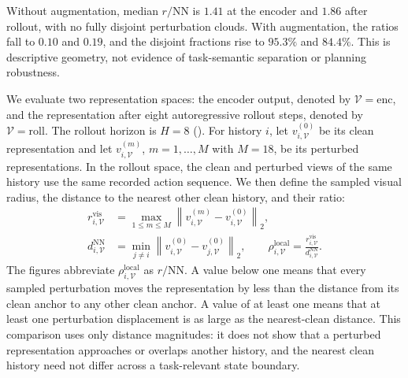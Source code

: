 \documentclass{article}
\begin{document}
Without augmentation, median $r/\mathrm{NN}$ is $1.41$ at the encoder and
$1.86$ after rollout, with no fully disjoint perturbation clouds. With
augmentation, the ratios fall to $0.10$ and $0.19$, and the disjoint fractions
rise to $95.3\%$ and $84.4\%$. This is descriptive geometry, not evidence of
task-semantic separation or planning robustness.

We evaluate two representation spaces: the encoder output, denoted by
$\mathcal V=\mathrm{enc}$, and the representation after eight autoregressive
rollout steps, denoted by $\mathcal V=\mathrm{roll}$. The rollout horizon is
$H=8$ (). For history $i$, let
$v_{i,\mathcal V}^{(0)}$ be its clean representation and let
$v_{i,\mathcal V}^{(m)}$, $m=1,\ldots,M$ with $M=18$, be its perturbed
representations. In the rollout space, the clean and perturbed views of the
same history use the same recorded action sequence. We then define the sampled
visual radius, the distance to the nearest other clean history, and their ratio:
\begin{align}
r_{i,\mathcal V}^{\mathrm{vis}}
&=\max_{1\leq m\leq M}
\left\|v_{i,\mathcal V}^{(m)}-v_{i,\mathcal V}^{(0)}\right\|_2,
\nonumber\\
d_{i,\mathcal V}^{\mathrm{NN}}
&=\min_{j\neq i}
\left\|v_{i,\mathcal V}^{(0)}-v_{j,\mathcal V}^{(0)}\right\|_2,
\qquad
\rho_{i,\mathcal V}^{\mathrm{local}}
=\frac{r_{i,\mathcal V}^{\mathrm{vis}}}
{d_{i,\mathcal V}^{\mathrm{NN}}}.
\label{eq:local-radius-spacing}
\end{align}
The figures abbreviate $\rho_{i,\mathcal V}^{\mathrm{local}}$ as
$r/\mathrm{NN}$. A value below one means that every sampled perturbation moves
the representation by less than the distance from its clean anchor to any
other clean anchor. A value of at least one means that at least one
perturbation displacement is as large as the nearest-clean distance. This
comparison uses only distance magnitudes: it does not show that a perturbed
representation approaches or overlaps another history, and the nearest clean
history need not differ across a task-relevant state boundary.
\end{document}
